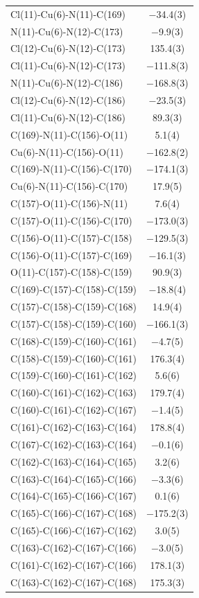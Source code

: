 \begin{center}
{\begin{supertabular}{p{1.8in}c}
Cl(11)-Cu(6)-N(11)-C(169)&$-$34.4(3)\\
N(11)-Cu(6)-N(12)-C(173)&$-$9.9(3)\\
Cl(12)-Cu(6)-N(12)-C(173)&135.4(3)\\
Cl(11)-Cu(6)-N(12)-C(173)&$-$111.8(3)\\
N(11)-Cu(6)-N(12)-C(186)&$-$168.8(3)\\
Cl(12)-Cu(6)-N(12)-C(186)&$-$23.5(3)\\
Cl(11)-Cu(6)-N(12)-C(186)&89.3(3)\\
C(169)-N(11)-C(156)-O(11)&5.1(4)\\
Cu(6)-N(11)-C(156)-O(11)&$-$162.8(2)\\
C(169)-N(11)-C(156)-C(170)&$-$174.1(3)\\
Cu(6)-N(11)-C(156)-C(170)&17.9(5)\\
C(157)-O(11)-C(156)-N(11)&7.6(4)\\
C(157)-O(11)-C(156)-C(170)&$-$173.0(3)\\
C(156)-O(11)-C(157)-C(158)&$-$129.5(3)\\
C(156)-O(11)-C(157)-C(169)&$-$16.1(3)\\
O(11)-C(157)-C(158)-C(159)&90.9(3)\\
C(169)-C(157)-C(158)-C(159)&$-$18.8(4)\\
C(157)-C(158)-C(159)-C(168)&14.9(4)\\
C(157)-C(158)-C(159)-C(160)&$-$166.1(3)\\
C(168)-C(159)-C(160)-C(161)&$-$4.7(5)\\
C(158)-C(159)-C(160)-C(161)&176.3(4)\\
C(159)-C(160)-C(161)-C(162)&5.6(6)\\
C(160)-C(161)-C(162)-C(163)&179.7(4)\\
C(160)-C(161)-C(162)-C(167)&$-$1.4(5)\\
C(161)-C(162)-C(163)-C(164)&178.8(4)\\
C(167)-C(162)-C(163)-C(164)&$-$0.1(6)\\
C(162)-C(163)-C(164)-C(165)&3.2(6)\\
C(163)-C(164)-C(165)-C(166)&$-$3.3(6)\\
C(164)-C(165)-C(166)-C(167)&0.1(6)\\
C(165)-C(166)-C(167)-C(168)&$-$175.2(3)\\
C(165)-C(166)-C(167)-C(162)&3.0(5)\\
C(163)-C(162)-C(167)-C(166)&$-$3.0(5)\\
C(161)-C(162)-C(167)-C(166)&178.1(3)\\
C(163)-C(162)-C(167)-C(168)&175.3(3)\\

\end{supertabular}}
\end{center}
